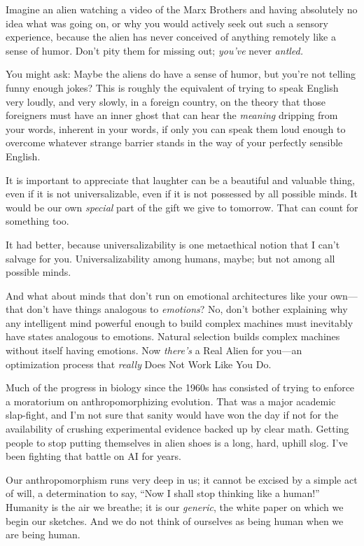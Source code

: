 {
 Imagine an alien watching a video of the Marx Brothers and having
absolutely no idea what was going on, or why you would actively seek
out such a sensory experience, because the alien has never conceived of
anything remotely like a sense of humor. Don't pity
them for missing out; \textit{you've} never
\textit{antled.}}

{
 You might ask: Maybe the aliens do have a sense of humor, but
you're not telling funny enough jokes? This is roughly
the equivalent of trying to speak English very loudly, and very slowly,
in a foreign country, on the theory that those foreigners must have an
inner ghost that can hear the \textit{meaning} dripping from your
words, inherent in your words, if only you can speak them loud enough
to overcome whatever strange barrier stands in the way of your
perfectly sensible English.}

{
 It is important to appreciate that laughter can be a beautiful and
valuable thing, even if it is not universalizable, even if it is not
possessed by all possible minds. It would be our own \textit{special}
part of the gift we give to tomorrow. That can count for something
too.}

{
 It had better, because universalizability is one metaethical
notion that I can't salvage for you. Universalizability
among humans, maybe; but not among all possible minds.}

{
 And what about minds that don't run on emotional
architectures like your own---that don't have things
analogous to \textit{emotions}? No, don't bother
explaining why any intelligent mind powerful enough to build complex
machines must inevitably have states analogous to emotions. Natural
selection builds complex machines without itself having emotions. Now
\textit{there's} a Real Alien for you---an optimization
process that \textit{really} Does Not Work Like You Do.}

{
 Much of the progress in biology since the 1960s has consisted of
trying to enforce a moratorium on anthropomorphizing evolution. That
was a major academic slap-fight, and I'm not sure that
sanity would have won the day if not for the availability of crushing
experimental evidence backed up by clear math. Getting people to stop
putting themselves in alien shoes is a long, hard, uphill slog.
I've been fighting that battle on AI for years.}

{
 Our anthropomorphism runs very deep in us; it cannot be excised by
a simple act of will, a determination to say, ``Now I
shall stop thinking like a human!'' Humanity is the
air we breathe; it is our \textit{generic}, the white paper on which we
begin our sketches. And we do not think of ourselves as being human
when we are being human.}


